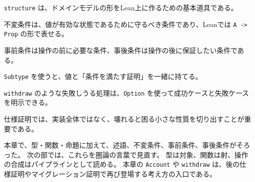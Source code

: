 \texttt{structure} は、ドメインモデルの形をLean上に作るための基本道具である。

不変条件は、値が有効な状態であるために守るべき条件であり、Leanでは \texttt{A -> Prop} の形で表せる。

事前条件は操作の前に必要な条件、事後条件は操作の後に保証したい条件である。

\texttt{Subtype} を使うと、値と「条件を満たす証明」を一緒に持てる。

\texttt{withdraw} のような失敗しうる処理は、\texttt{Option} を使って成功ケースと失敗ケースを明示できる。

仕様証明では、実装全体ではなく、壊れると困る小さな性質を切り出すことが重要である。

本章で、型・関数・命題に加えて、述語、不変条件、事前条件、事後条件がそろった。
次の部では、これらを圏論の言葉で見直す。
型は対象、関数は射、操作の合成はパイプラインとして読める。
本章の \texttt{Account} や \texttt{withdraw} は、後の仕様証明やマイグレーション証明で再び登場する考え方の入口である。

